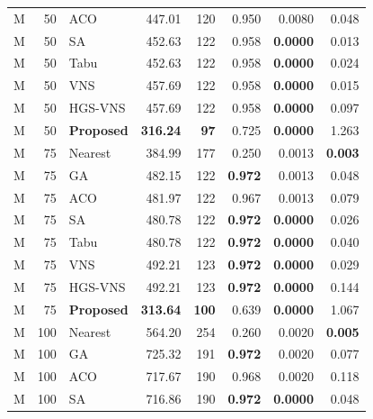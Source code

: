 \begin{longtable}{@{}rrlrrrrr@{}}
M & 50 & ACO & 447.01 & 120 & 0.950 & 0.0080 & 0.048 \\

M & 50 & SA & 452.63 & 122 & 0.958 & \textbf{0.0000} & 0.013 \\

M & 50 & Tabu & 452.63 & 122 & 0.958 & \textbf{0.0000} & 0.024 \\

M & 50 & VNS & 457.69 & 122 & 0.958 & \textbf{0.0000} & 0.015 \\

M & 50 & HGS-VNS & 457.69 & 122 & 0.958 & \textbf{0.0000} & 0.097 \\
\rowcolor{gray!10}
M & 50 & \textbf{Proposed} & \textbf{316.24} & \textbf{97} & 0.725 & \textbf{0.0000} & 1.263 \\
\addlinespace[2pt]

M & 75 & Nearest & 384.99 & 177 & 0.250 & 0.0013 & \textbf{0.003} \\

M & 75 & GA & 482.15 & 122 & \textbf{0.972} & 0.0013 & 0.048 \\

M & 75 & ACO & 481.97 & 122 & 0.967 & 0.0013 & 0.079 \\

M & 75 & SA & 480.78 & 122 & \textbf{0.972} & \textbf{0.0000} & 0.026 \\

M & 75 & Tabu & 480.78 & 122 & \textbf{0.972} & \textbf{0.0000} & 0.040 \\

M & 75 & VNS & 492.21 & 123 & \textbf{0.972} & \textbf{0.0000} & 0.029 \\

M & 75 & HGS-VNS & 492.21 & 123 & \textbf{0.972} & \textbf{0.0000} & 0.144 \\
\rowcolor{gray!10}
M & 75 & \textbf{Proposed} & \textbf{313.64} & \textbf{100} & 0.639 & \textbf{0.0000} & 1.067 \\
\addlinespace[2pt]

M & 100 & Nearest & 564.20 & 254 & 0.260 & 0.0020 & \textbf{0.005} \\

M & 100 & GA & 725.32 & 191 & \textbf{0.972} & 0.0020 & 0.077 \\

M & 100 & ACO & 717.67 & 190 & 0.968 & 0.0020 & 0.118 \\

M & 100 & SA & 716.86 & 190 & \textbf{0.972} & \textbf{0.0000} & 0.048 \\


\end{longtable}
